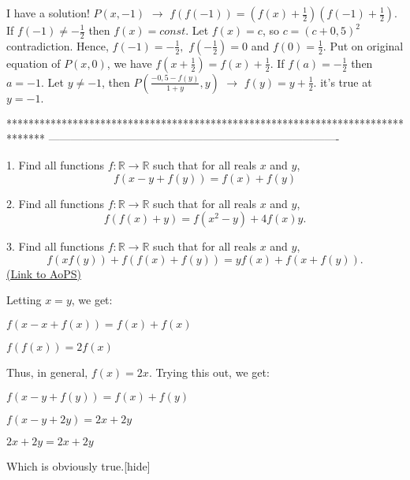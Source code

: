 


\begin{solution}
	I have a solution!
$P(x,-1)$ $\rightarrow $ $f(f(-1))=(f(x)+\frac{1}{2})(f(-1)+\frac{1}{2}). $  If $f(-1)\not= -\frac{1}{2} $ then  $f(x)=const $.  Let  $f(x)=c$, so  $c=(c+0,5)^2$  contradiction.
Hence, $f(-1)=-\frac{1}{2},$ $f(-\frac{1}{2})=0$ and $f(0)=\frac{1}{2}.$
Put on original equation of $P(x,0)$, we have  $f(x+\frac{1}{2})=f(x)+\frac{1}{2}.$
If $f(a)=-\frac{1}{2}$ then $a=-1.$  Let $y\not=-1$, then 
$P(\frac{-0,5-f(y)}{1+y}, y)$ $ \rightarrow $  $f(y)=y+\frac{1}{2}.$
it's true at $y=-1.$ 
\end{solution}
*******************************************************************************
-------------------------------------------------------------------------------

\begin{problem}
	1. Find all functions $f: \mathbb R \to \mathbb R$ such that for all reals $x$ and $y$,
\[f(x-y+f(y))=f(x)+f(y)\]

2. Find all functions $f: \mathbb R \to \mathbb R$ such that for all reals $x$ and $y$,
\[f(f(x) +y)=f(x^2 -y) + 4f(x)y.\]

3. Find all functions $f: \mathbb R \to \mathbb R$ such that for all reals $x$ and $y$,
\[f(xf(y)) +f(f(x)+f(y))=yf(x) +f(x+f(y)).\]
	\flushright \href{https://artofproblemsolving.com/community/c6h388552}{(Link to AoPS)}
\end{problem}



\begin{solution}Letting $x = y$, we get:

$f(x - x + f(x)) = f(x) + f(x)$

$f(f(x)) = 2f(x)$

Thus, in general, $f(x) = 2x$. Trying this out, we get:

$f(x - y + f(y)) = f(x) + f(y)$

$f(x - y + 2y) = 2x + 2y$

$2x + 2y = 2x + 2y$

Which is obviously true.[\/hide]
\end{solution}



